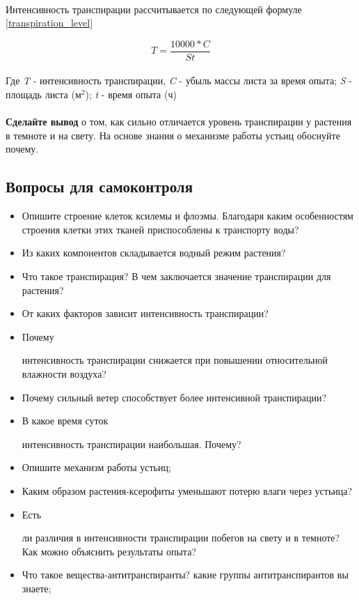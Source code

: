 \paragraph*{}Интенсивность транспирации рассчитывается  по следующей формуле \ref{transpiration_level} 

\begin{equation}
	\label{transpiration_level}
	T = \frac{10000*C}{St}
\end{equation}

\paragraph*{}Где \textit{T} - интенсивность транспирации, \textit{C} - убыль массы листа за время опыта; \textit{S} - площадь листа (м$^2$); \textit{t} - время опыта (ч)

\paragraph*{}\textbf{Сделайте вывод} о том, как сильно отличается уровень транспирации у растения в темноте и на свету. На основе знания о механизме работы устьиц \cite{fzr_ermakov, fzr_jakushina} обоснуйте почему.

\subsection*{Вопросы для самоконтроля}

	\begin{itemize}
		\item Опишите строение клеток \hypertarget{xsilema_tisue}{ксилемы и флоэмы}. Благодаря каким особенностям строения клетки этих тканей приспособлены к транспорту воды?
		\item Из каких компонентов складывается водный режим растения?
		\item Что такое \hypertarget{transpiration_question}{транспирация}? В чем заключается значение транспирации для растения?
		\item От каких факторов зависит \hypertarget{transpiration_intensivity}{интенсивность транспирации}?
		\item \hypertarget{transpiration_air_humidity}{Почему} интенсивность транспирации снижается при повышении относительной влажности воздуха?
		\item Почему сильный ветер способствует более интенсивной транспирации?
		\item \hypertarget{transpiration_time}{В какое время суток} интенсивность транспирации наибольшая. Почему?
		\item Опишите механизм работы устьиц;
		\item Каким образом растения-ксерофиты уменьшают потерю влаги через устьица?
		\item \hypertarget{light_dark_diferences}{Есть} ли различия в интенсивности транспирации побегов на свету и в темноте? Как можно объяснить результаты опыта?
		\item Что такое вещества-антитранспиранты? какие группы антитранспирантов вы знаете;
	\end{itemize}